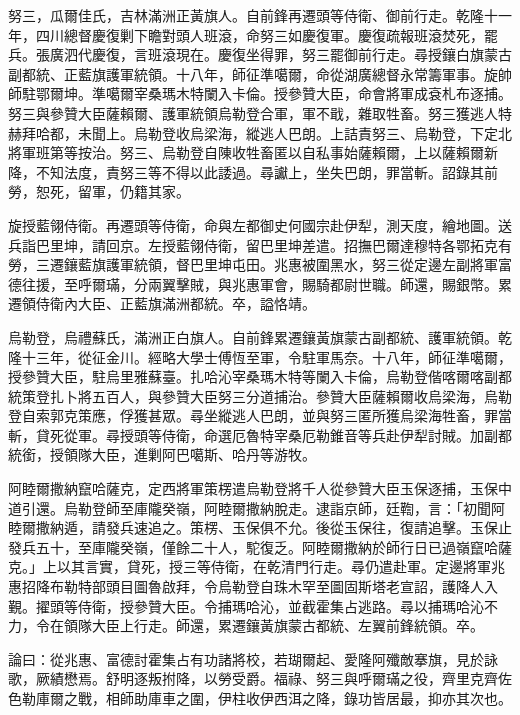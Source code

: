 \begin{pinyinscope}
努三，瓜爾佳氏，吉林滿洲正黃旗人。自前鋒再遷頭等侍衛、御前行走。乾隆十一年，四川總督慶復剿下瞻對頭人班滾，命努三如慶復軍。慶復疏報班滾焚死，罷兵。張廣泗代慶復，言班滾現在。慶復坐得罪，努三罷御前行走。尋授鑲白旗蒙古副都統、正藍旗護軍統領。十八年，師征準噶爾，命從湖廣總督永常籌軍事。旋帥師駐鄂爾坤。準噶爾宰桑瑪木特闌入卡倫。授參贊大臣，命會將軍成袞札布逐捕。努三與參贊大臣薩賴爾、護軍統領烏勒登合軍，軍不戢，雜取牲畜。努三獲逃人特赫拜哈都，未聞上。烏勒登收烏梁海，縱逃人巴朗。上詰責努三、烏勒登，下定北將軍班第等按治。努三、烏勒登自陳收牲畜匿以自私事始薩賴爾，上以薩賴爾新降，不知法度，責努三等不得以此諉過。尋讞上，坐失巴朗，罪當斬。詔錄其前勞，恕死，留軍，仍籍其家。

旋授藍翎侍衛。再遷頭等侍衛，命與左都御史何國宗赴伊犁，測天度，繪地圖。送兵詣巴里坤，請回京。左授藍翎侍衛，留巴里坤差遣。招撫巴爾達穆特各鄂拓克有勞，三遷鑲藍旗護軍統領，督巴里坤屯田。兆惠被圍黑水，努三從定邊左副將軍富德往援，至呼爾璊，分兩翼擊賊，與兆惠軍會，賜騎都尉世職。師還，賜銀幣。累遷領侍衛內大臣、正藍旗滿洲都統。卒，謚恪靖。

烏勒登，烏禮蘇氏，滿洲正白旗人。自前鋒累遷鑲黃旗蒙古副都統、護軍統領。乾隆十三年，從征金川。經略大學士傅恆至軍，令駐軍馬奈。十八年，師征準噶爾，授參贊大臣，駐烏里雅蘇臺。扎哈沁宰桑瑪木特等闌入卡倫，烏勒登偕喀爾喀副都統策登扎卜將五百人，與參贊大臣努三分道捕治。參贊大臣薩賴爾收烏梁海，烏勒登自索郭克策應，俘獲甚眾。尋坐縱逃人巴朗，並與努三匿所獲烏梁海牲畜，罪當斬，貸死從軍。尋授頭等侍衛，命選厄魯特宰桑厄勒錐音等兵赴伊犁討賊。加副都統銜，授領隊大臣，進剿阿巴噶斯、哈丹等游牧。

阿睦爾撒納竄哈薩克，定西將軍策楞遣烏勒登將千人從參贊大臣玉保逐捕，玉保中道引還。烏勒登師至庫隴癸嶺，阿睦爾撒納脫走。逮詣京師，廷鞫，言：「初聞阿睦爾撒納遁，請發兵速追之。策楞、玉保俱不允。後從玉保往，復請追擊。玉保止發兵五十，至庫隴癸嶺，僅餘二十人，駝復乏。阿睦爾撒納於師行日已過嶺竄哈薩克。」上以其言實，貸死，授三等侍衛，在乾清門行走。尋仍遣赴軍。定邊將軍兆惠招降布勒特部頭目圖魯啟拜，令烏勒登自珠木罕至圖固斯塔老宣詔，護降人入覲。擢頭等侍衛，授參贊大臣。令捕瑪哈沁，並截霍集占逃路。尋以捕瑪哈沁不力，令在領隊大臣上行走。師還，累遷鑲黃旗蒙古都統、左翼前鋒統領。卒。

論曰：從兆惠、富德討霍集占有功諸將校，若瑚爾起、愛隆阿殲敵搴旗，見於詠歌，厥績懋焉。舒明逐叛拊降，以勞受爵。福祿、努三與呼爾璊之役，齊里克齊佐色勒庫爾之戰，相師助庫車之圍，伊柱收伊西洱之降，錄功皆居最，抑亦其次也。


\end{pinyinscope}